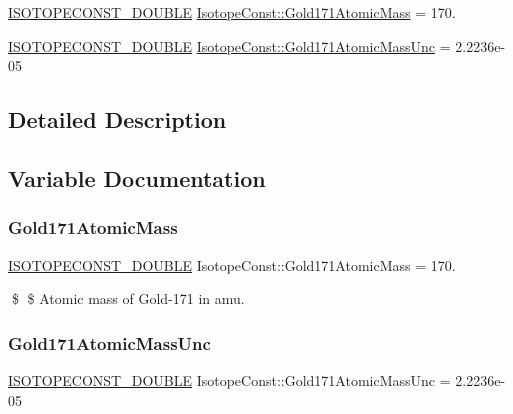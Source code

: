 \begin{DoxyCompactItemize}
\item 
\mbox{\hyperlink{group___isotope_const-_macros_ga8f45a7272ce02c0b4c65c44636ed719a}{I\+S\+O\+T\+O\+P\+E\+C\+O\+N\+S\+T\+\_\+\+D\+O\+U\+B\+LE}} \mbox{\hyperlink{group___isotope_const-_gold-_au171_gaaba080dffee5ec5b450954d61da8ac8c}{Isotope\+Const\+::\+Gold171\+Atomic\+Mass}} = 170.
\item 
\mbox{\hyperlink{group___isotope_const-_macros_ga8f45a7272ce02c0b4c65c44636ed719a}{I\+S\+O\+T\+O\+P\+E\+C\+O\+N\+S\+T\+\_\+\+D\+O\+U\+B\+LE}} \mbox{\hyperlink{group___isotope_const-_gold-_au171_ga64c2f5a4b72abc79af45de90a43a304f}{Isotope\+Const\+::\+Gold171\+Atomic\+Mass\+Unc}} = 2.\+2236e-\/05
\end{DoxyCompactItemize}


\subsection{Detailed Description}


\subsection{Variable Documentation}
\mbox{\label{group___isotope_const-_gold-_au171_gaaba080dffee5ec5b450954d61da8ac8c}} 
\subsubsection{\texorpdfstring{Gold171\+Atomic\+Mass}{Gold171AtomicMass}}
{\footnotesize\ttfamily \mbox{\hyperlink{group___isotope_const-_macros_ga8f45a7272ce02c0b4c65c44636ed719a}{I\+S\+O\+T\+O\+P\+E\+C\+O\+N\+S\+T\+\_\+\+D\+O\+U\+B\+LE}} Isotope\+Const\+::\+Gold171\+Atomic\+Mass = 170.}

\$ \$ Atomic mass of Gold-\/171 in amu. \mbox{\label{group___isotope_const-_gold-_au171_ga64c2f5a4b72abc79af45de90a43a304f}} 
\subsubsection{\texorpdfstring{Gold171\+Atomic\+Mass\+Unc}{Gold171AtomicMassUnc}}
{\footnotesize\ttfamily \mbox{\hyperlink{group___isotope_const-_macros_ga8f45a7272ce02c0b4c65c44636ed719a}{I\+S\+O\+T\+O\+P\+E\+C\+O\+N\+S\+T\+\_\+\+D\+O\+U\+B\+LE}} Isotope\+Const\+::\+Gold171\+Atomic\+Mass\+Unc = 2.\+2236e-\/05}

